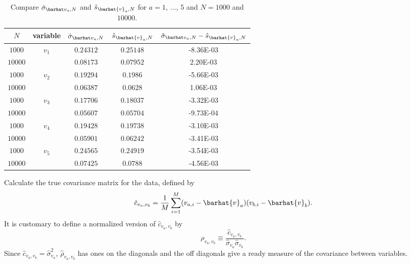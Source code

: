\begin{table}[H]
    \centering
    \caption{Compare \(\sgbar{a}\) and \(\hat{s}_{\barhat{v}_a,N}\) for
    \(a = 1\), \(\ldots\), \(5\) and \(N = 1000\) and \(10000\).}
    \label{tab:s}
    \begin{tabular}{@{}ccccc@{}}
        \toprule
        \(N\)     & variable                 & \(\sgbar{a}\) & \(\hat{s}_{\barhat{v}_a,N}\) & \(\sgbar{a}-\hat{s}_{\barhat{v}_a,N}\) \\
        \midrule
        \(1000\)  & \multirow{2}{*}{\(v_1\)} & \(0.24312\)   & \(0.25148\)                  & \num{-8.36E-03}                        \\
        \(10000\) &                          & \(0.08173\)   & \(0.07952\)                  & \num{2.20E-03}                         \\
        \cmidrule{1-2}
        \(1000\)  & \multirow{2}{*}{\(v_2\)} & \(0.19294\)   & \(0.1986\)                   & \num{-5.66E-03}                        \\
        \(10000\) &                          & \(0.06387\)   & \(0.0628\)                   & \num{1.06E-03}                         \\
        \cmidrule{1-2}
        \(1000\)  & \multirow{2}{*}{\(v_3\)} & \(0.17706\)   & \(0.18037\)                  & \num{-3.32E-03}                        \\
        \(10000\) &                          & \(0.05607\)   & \(0.05704\)                  & \num{-9.73E-04}                        \\
        \cmidrule{1-2}
        \(1000\)  & \multirow{2}{*}{\(v_4\)} & \(0.19428\)   & \(0.19738\)                  & \num{-3.10E-03}                        \\
        \(10000\) &                          & \(0.05901\)   & \(0.06242\)                  & \num{-3.41E-03}                        \\
        \cmidrule{1-2}
        \(1000\)  & \multirow{2}{*}{\(v_5\)} & \(0.24565\)   & \(0.24919\)                  & \num{-3.54E-03}                        \\
        \(10000\) &                          & \(0.07425\)   & \(0.0788\)                   & \num{-4.56E-03}                        \\
        \bottomrule
    \end{tabular}
\end{table}

\Question{} Calculate the true covariance matrix for the data, defined by
%
\begin{equation}
    \hat{c}_{v_a, v_b} = \frac{ 1 }{ M }
    \sum_{i=1}^M (v_{a,i} - \barhat{v}_a) (v_{b,i} - \barhat{v}_b).
\end{equation}
%
It is customary to define a normalized version of \(\hat{c}_{v_a, v_b}\) by
%
\begin{equation}
    \hat{\rho}_{v_a, v_b} \equiv \frac{ \hat{c}_{v_a, v_b} }{ \hat{\sigma}_{v_a} \hat{\sigma}_{v_b} }.
\end{equation}
%
Since \(\hat{c}_{v_a, v_b} = \hat{\sigma}_{v_a}^2\),
\(\hat{\rho}_{v_a, v_b}\) has ones on the diagonals and the off diagonals give a
ready measure of the covariance between variables.

